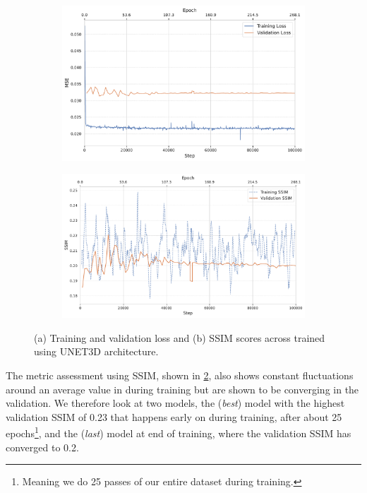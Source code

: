 \begin{figure}
    \centering
    \begin{subfigure}[t]{0.49\linewidth}
        \centering
        \includegraphics[width=1\linewidth]{images/loss_training_val.pdf}
        \caption{}
        \label{fig:loss-training-val}
    \end{subfigure}
    \hfill
    \begin{subfigure}[t]{0.49\linewidth}
        \centering
        \includegraphics[width=1\linewidth]{images/ssim_training_val.pdf}
        \caption{}
        \label{fig:ssim-training-val}
    \end{subfigure}
    \caption{(a) Training and validation loss and (b) \gls{SSIM} scores across  trained using UNET3D architecture.}
    \label{fig:loss-ssim-training-val}
\end{figure}

The metric assessment using \gls{SSIM}, shown in \cref{fig:ssim-training-val}, also shows constant fluctuations around an average value in during training but are shown to be converging in the validation. We therefore look at two models, the (\textit{best}) model with the highest validation \gls{SSIM} of \num{0.23} that happens early on during training, after about \num{25} epochs\footnote{Meaning we do \num{25} passes of our entire dataset during training.}, and the (\textit{last}) model at end of training, where the validation \gls{SSIM} has converged to \num{0.2}.

